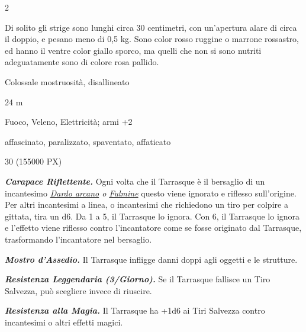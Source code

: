\begin{multicols}{2}
{Di solito gli strige sono lunghi circa 30 centimetri, con un'apertura alare di circa il doppio, e pesano meno di 0,5 kg. Sono color rosso ruggine o marrone rossastro, ed hanno il ventre color giallo sporco, ma quelli che non si sono nutriti adeguatamente sono di colore rosa pallido.


\begin{description}[noitemsep, topsep=0pt, parsep=0pt, partopsep=0pt, itemsep=1pt, leftmargin=2.35cm,  labelwidth=2.2cm, itemindent=0cm, listparindent=0pt] %
\setlength{\baselineskip}{10pt}
\item[\textbf{Taglia/Tipo}] Colossale mostruosità, disallineato
\item[\textbf{Caratt.}] 
\item[\textbf{Punti Ferita}] 
\item[\textbf{Movimento}] 24 m
\item[\textbf{Tiri Salvez.}] 
\item[\textbf{Imm. Danni}] Fuoco, Veleno, Elettricità; armi +2
\item[\textbf{Immunità}] affascinato, paralizzato, spaventato, affaticato
\item[\textbf{Sensi}] 
\item[\textbf{Sfida}] 30 (155000 PX)
\end{description}
\smallskip

\emph{\textbf{Carapace Riflettente.}} Ogni volta che il Tarrasque è il bersaglio di un incantesimo \emph{\hyperlink{Dardo arcano}{Dardo arcano} o \hyperlink{Fulmine}{Fulmine}} questo viene ignorato e riflesso sull'origine. Per altri incantesimi a linea, o incantesimi che richiedono un tiro per colpire a gittata, tira un d6. Da 1 a 5, il Tarrasque lo ignora. Con 6, il Tarrasque lo ignora e l'effetto viene riflesso contro l'incantatore come se fosse originato dal Tarrasque, trasformando l'incantatore nel bersaglio.

\emph{\textbf{Mostro d'Assedio.}} Il Tarrasque infligge danni doppi agli oggetti e le strutture.

\emph{\textbf{Resistenza Leggendaria (3/Giorno).}} Se il Tarrasque fallisce un Tiro Salvezza, può scegliere invece di riuscire.

\emph{\textbf{Resistenza alla Magia.}} Il Tarrasque ha +1d6 ai Tiri Salvezza contro incantesimi o altri effetti magici.

}
\end{multicols}
